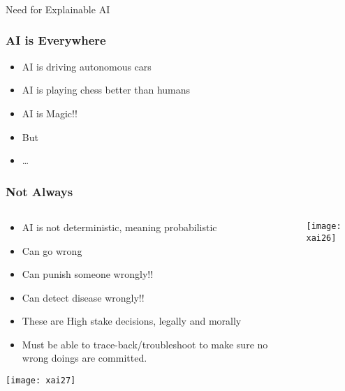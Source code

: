 \begin{frame}[fragile]\frametitle{}
\begin{center}
{\Large Need for Explainable AI}
\end{center}
\end{frame}


\begin{frame}[fragile]\frametitle{AI is Everywhere}
\begin{itemize}
\item AI is driving autonomous cars
\item AI is playing chess better than humans
\item AI is Magic!!
\item But
\item \ldots
\end{itemize}
\end{frame}

\begin{frame}[fragile]\frametitle{Not Always}

\begin{columns}
    \begin{column}[T]{0.6\linewidth}
		
			\begin{itemize}
			\item AI is not deterministic, meaning probabilistic
			\item Can go wrong
			\item Can punish someone wrongly!!
			\item Can detect disease wrongly!!
			\item These are High stake decisions, legally and morally
			\item Must be able to trace-back/troubleshoot to make sure no wrong doings are committed.
			\end{itemize}
				
      \begin{center}
      \texttt{[image: xai27]}
	  	\end{center}
			
    \end{column}
    \begin{column}[T]{0.4\linewidth}

      \begin{center}
      \texttt{[image: xai26]}
	  	\end{center}
    \end{column}
  \end{columns}
	
	

\end{frame}

